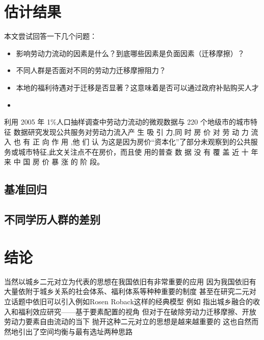 \documentclass[a4paper,12pt]{article}
\begin{document}
\section{估计结果}

本文尝试回答一下几个问题：
\begin{itemize}
  \item 影响劳动力流动的因素是什么？到底哪些因素是负面因素（迁移摩擦）？
  \item 不同人群是否面对不同的劳动力迁移摩擦阻力？
  \item 本地的福利待遇对于迁移是否显著？这意味着是否可以通过政府补贴购买人才
  \item 
\end{itemize}


\cite{XiaYiRanChengShiJianDeMengMuSanQianGongGongFuWuYingXiangLaoDongLiLiuXiangDeJingYanYanJiu2015} 利用 2005 年 1\%人口抽样调查中劳动力流动的微观数据与 220 个地级市的城市特征 数据研究发现公共服务对劳动力流入产 生 吸 引 力,同 时 房 价 对 劳 动 力 流 入 也 有 正 向 作 用 ,他 们 认 为这是因为房价“资本化”了部分未观察到的公共服务或城市特征,此文关注点不在房价，而且使 用的普查 数 据 没 有 覆 盖 近 十 年 来 中 国 房 价 暴 涨 的 阶 段。

\subsection{基准回归} %
\label{sub:基准回归}



\subsection{不同学历人群的差别} %
\label{sub:不同学历人群的差别}




\section{结论}
当然以城乡二元对立为代表的思想在我国依旧有非常重要的应用 因为我国依旧有大量依附于城乡关系的社会体系、福利体系等种种重要的制度
甚至在研究二元对立话题中依旧可以引入例如Rosen Roback这样的经典模型
例如 
\cite{GuoDongMeiChengXiangRongHeDeShouRuHeFuLiXiaoYingYanJiuJiYuYaoSuPeiZhiDeShiJiao2023}指出城乡融合的收入和福利效应研究——基于要素配置的视角
但对于在破除劳动力迁移摩擦、开放劳动力要素自由流动的当下
抛开这种二元对立的思想是越来越重要的
这也自然而然地引出了空间均衡与最有选址两种思路
\end{document}
